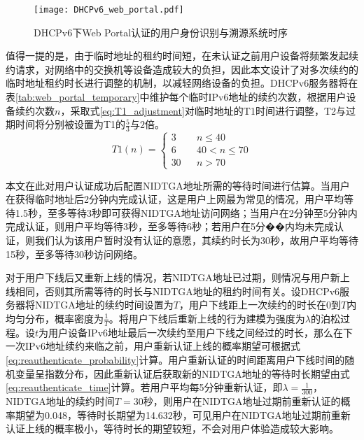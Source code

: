    \begin{figure}[ht]
      \centering
      \texttt{[image: DHCPv6\_web\_portal.pdf]}
      \caption{DHCPv6下Web Portal认证的用户身份识别与溯源系统时序}
      \label{fig:DHCPv6_web_portal}
    \end{figure}

    值得一提的是，由于临时地址的租约时间短，在未认证之前用户设备将频繁发起续约请求，对网络中的交换机等设备造成较大的负担，因此本文设计了对多次续约的临时地址租约时长进行调整的机制，以减轻网络设备的负担。DHCPv6服务器将在表\ref{tab:web_portal_temporary}中维护每个临时IPv6地址的续约次数，根据用户设备续约次数$n$，采取式\eqref{eq:T1_adjustment}对临时地址的T1时间进行调整，T2与过期时间将分别被设置为T1的$\frac{5}{3}$与$2$倍。
    \begin{equation}
      \label{eq:T1_adjustment}
      T1(n) = \left\{
      \begin{array}{rcl}
        3 & & {n \leq 40} \\
        6 & & {40 < n \leq 70} \\
        30 & & {n > 70}   
      \end{array}
      \right.
    \end{equation}

    本文在此对用户认证成功后配置NIDTGA地址所需的等待时间进行估算。当用户在获得临时地址后2分钟内完成认证，这是用户上网最为常见的情况，用户平均等待1.5秒，至多等待3秒即可获得NIDTGA地址访问网络；当用户在2分钟至5分钟内完成认证，则用户平均等待3秒，至多等待6秒；若用户在5分��内均未完成认证，则我们认为该用户暂时没有认证的意愿，其续约时长为30秒，故用户平均等待15秒，至多等待30秒访问网络。

    对于用户下线后又重新上线的情况，若NIDTGA地址已过期，则情况与用户新上线相同，否则其所需等待的时长与NIDTGA地址的租约时间有关。设DHCPv6服务器将NIDTGA地址的续约时间设置为$T$，用户下线距上一次续约的时长在0到$T$内均匀分布，概率密度为$\frac{1}{T}$。将用户下线后重新上线的行为建模为强度为$\lambda$的泊松过程。设$t$为用户设备IPv6地址最后一次续约至用户下线之间经过的时长，那么在下一次IPv6地址续约来临之前，用户重新认证上线的概率期望可根据式\eqref{eq:reauthenticate_probability}计算。用户重新认证的时间距离用户下线时间的随机变量呈指数分布，因此重新认证后获取新的NIDTGA地址的等待时长期望由式\eqref{eq:reauthenticate_time}计算。若用户平均每5分钟重新认证，即$\lambda = \frac{1}{300}$，NIDTGA地址的续约时间$T=30$秒，则用户在NIDTGA地址过期前重新认证的概率期望为0.048，等待时长期望为14.632秒，可见用户在NIDTGA地址过期前重新认证上线的概率极小，等待时长的期望较短，不会对用户体验造成较大影响。

